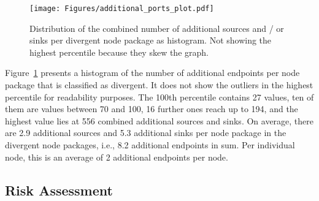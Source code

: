 \begin{figure}
    \centering
    \texttt{[image: Figures/additional\_ports\_plot.pdf]}
    \caption{Distribution of the combined number of additional sources and / or sinks per divergent node package as histogram. Not showing the highest percentile because they skew the graph.}
    \label{fig:additional_sources_sinks_histogram}
\end{figure}


Figure~\ref{fig:additional_sources_sinks_histogram} presents a histogram of the number of additional endpoints per node package that is classified as divergent.
It does not show the outliers in the highest percentile for readability purposes. 
The 100th percentile contains 27 values, ten of them are values between 70 and 100, 16 further ones reach up to 194, and the highest value lies at 556 combined additional sources and sinks.
On average, there are 2.9 additional sources and 5.3 additional sinks per node package in the divergent node packages, i.e., 8.2 additional endpoints in sum.
Per individual node, this is an average of 2 additional endpoints per node.

\vspace{2mm}
\noindent
{}%



\subsection{Risk Assessment}
\label{subsec:risk_assessment}

